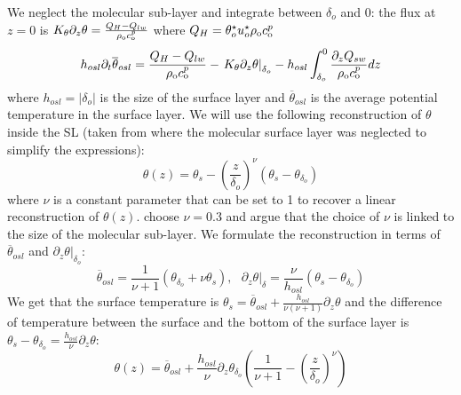 \par
We neglect the molecular sub-layer and
integrate between $\delta_o$ and 0:
the flux at $z=0$ is
$K_\theta \partial_z \theta = \frac{Q_H - Q_{lw}}{\rho_{\rm o} c_{\rm o}^p}$
where $Q_H = \theta_o^\star u_o^\star \rho_{\rm o} c_{\rm o}^p$
\begin{equation}
\label{eq:evolEqOSL}
h_{osl}\partial_t \overline{\theta}_{osl} =
	\frac{Q_H - Q_{lw}}{\rho_{\rm o} c_{\rm o}^p}
- \left. K_\theta \partial_z \theta 
\right|_{\delta_{o}}
- h_{osl}\int_{\delta_o}^0
	\frac{\partial_z Q_{sw}}{\rho_{\rm o} c_{\rm o}^p} dz
\end{equation}
where $h_{osl} = |\delta_o|$
is the size of the surface layer and
$\overline{\theta}_{osl}$ is the average potential
temperature in the surface layer.
We will use the following reconstruction of $\theta$
inside the SL (taken from \citep{zeng_prognostic_2005}
where the molecular surface layer was neglected to simplify
the expressions):
\begin{equation}
	\label{eq:ND_Ocean_reconstructionSimpleTheta}
    \theta(z) = \theta_s -
    \left(\frac{z}{\delta_{o}}\right)^\nu \left( \theta_s - 
    \theta_{\delta_o}\right)
\end{equation}
where $\nu$ is a constant parameter that can be set to 1 to
recover a linear reconstruction of $\theta(z)$.
\cite{zeng_prognostic_2005} choose $\nu=0.3$ and argue that
the choice of $\nu$ is linked to the size of the molecular
sub-layer.
We formulate the reconstruction in terms of $\overline{\theta}_{osl}$
and $\left.\partial_z \theta\right|_{\delta_o}$:
\begin{equation}
    \overline{\theta}_{osl} = \frac{1}{\nu+1}
    (\theta_{\delta_o} + \nu \theta_s)
, ~~~ \left.\partial_z \theta \right|_\delta
= \frac{\nu}{h_{osl}} (\theta_s - \theta_{\delta_o})
\end{equation}
We get that the surface temperature
is $\theta_s = \overline{\theta}_{osl}
+ \frac{h_{osl}}{\nu(\nu+1)} \partial_z \theta$ and
the difference of temperature between
the surface and the bottom of the surface layer is
$\theta_s - \theta_{\delta_o} = 
\frac{h_{osl}}{\nu}\partial_z \theta$:
\begin{equation}
    \theta(z) = \overline{\theta}_{osl} +
    \frac{h_{osl}}{\nu} \partial_z \theta_{\delta_o} \left(
    \frac{1}{\nu+1} - \left(\frac{z}{\delta_{o}}\right)^\nu
\right)
\end{equation}
